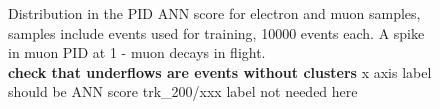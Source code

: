 \begin{figure}[H]
  \caption{
    \label{fig:pid_training_4}
    Distribution in the PID ANN score for electron and muon samples, samples include events used for training,
    10000 events each. A spike in muon PID at 1  - muon decays in flight. \\ 
    {\color{red} \bf check that underflows are events without clusters}
    {\blue x axis label should be ANN score}
    {\blue trk\_200/xxx label not needed here}    
  }
\end{figure}

